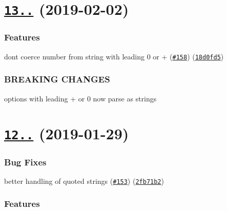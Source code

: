 \label{_13.0.0}%
 \section*{\href{https://github.com/yargs/yargs-parser/compare/v12.0.0...v13.0.0}{\tt 13..} (2019-\/02-\/02)}

\subsubsection*{Features}


\begin{DoxyItemize}
\item don\textquotesingle{}t coerce number from string with leading \textquotesingle{}0\textquotesingle{} or \textquotesingle{}+\textquotesingle{} (\href{https://github.com/yargs/yargs-parser/issues/158}{\tt \#158}) (\href{https://github.com/yargs/yargs-parser/commit/18d0fd5}{\tt 18d0fd5})
\end{DoxyItemize}

\subsubsection*{B\+R\+E\+A\+K\+I\+NG C\+H\+A\+N\+G\+ES}


\begin{DoxyItemize}
\item options with leading \textquotesingle{}+\textquotesingle{} or \textquotesingle{}0\textquotesingle{} now parse as strings
\end{DoxyItemize}

\label{_12.0.0}%
 \section*{\href{https://github.com/yargs/yargs-parser/compare/v11.1.1...v12.0.0}{\tt 12..} (2019-\/01-\/29)}

\subsubsection*{Bug Fixes}


\begin{DoxyItemize}
\item better handling of quoted strings (\href{https://github.com/yargs/yargs-parser/issues/153}{\tt \#153}) (\href{https://github.com/yargs/yargs-parser/commit/2fb71b2}{\tt 2fb71b2})
\end{DoxyItemize}

\subsubsection*{Features}


